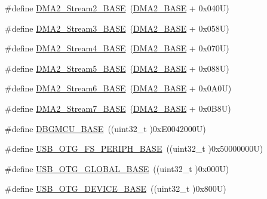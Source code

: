\begin{DoxyCompactItemize}
\item 
\#define \hyperlink{group___peripheral__registers__structures_gaed33a06f08188466f2ede06160984e9a}{D\+M\+A2\+\_\+\+Stream2\+\_\+\+B\+A\+SE}~(\hyperlink{group___peripheral__memory__map_gab72a9ae145053ee13d1d491fb5c1df64}{D\+M\+A2\+\_\+\+B\+A\+SE} + 0x040\+U)
\item 
\#define \hyperlink{group___peripheral__registers__structures_gaf3a9480e08c6ae94f4482e0cdaebdd17}{D\+M\+A2\+\_\+\+Stream3\+\_\+\+B\+A\+SE}~(\hyperlink{group___peripheral__memory__map_gab72a9ae145053ee13d1d491fb5c1df64}{D\+M\+A2\+\_\+\+B\+A\+SE} + 0x058\+U)
\item 
\#define \hyperlink{group___peripheral__registers__structures_gad1e67740e6301233473f64638145dd1f}{D\+M\+A2\+\_\+\+Stream4\+\_\+\+B\+A\+SE}~(\hyperlink{group___peripheral__memory__map_gab72a9ae145053ee13d1d491fb5c1df64}{D\+M\+A2\+\_\+\+B\+A\+SE} + 0x070\+U)
\item 
\#define \hyperlink{group___peripheral__registers__structures_gaed1460fdc407b6decfbffccb0260d0af}{D\+M\+A2\+\_\+\+Stream5\+\_\+\+B\+A\+SE}~(\hyperlink{group___peripheral__memory__map_gab72a9ae145053ee13d1d491fb5c1df64}{D\+M\+A2\+\_\+\+B\+A\+SE} + 0x088\+U)
\item 
\#define \hyperlink{group___peripheral__registers__structures_ga5e81174c96fd204fa7c82c815e85c8e6}{D\+M\+A2\+\_\+\+Stream6\+\_\+\+B\+A\+SE}~(\hyperlink{group___peripheral__memory__map_gab72a9ae145053ee13d1d491fb5c1df64}{D\+M\+A2\+\_\+\+B\+A\+SE} + 0x0\+A0\+U)
\item 
\#define \hyperlink{group___peripheral__registers__structures_gaa9faa708ad2440d24eb1064cba9bb06d}{D\+M\+A2\+\_\+\+Stream7\+\_\+\+B\+A\+SE}~(\hyperlink{group___peripheral__memory__map_gab72a9ae145053ee13d1d491fb5c1df64}{D\+M\+A2\+\_\+\+B\+A\+SE} + 0x0\+B8\+U)
\item 
\#define \hyperlink{group___peripheral__registers__structures_ga4adaf4fd82ccc3a538f1f27a70cdbbef}{D\+B\+G\+M\+C\+U\+\_\+\+B\+A\+SE}~((uint32\+\_\+t )0x\+E0042000\+U)
\item 
\#define \hyperlink{group___peripheral__registers__structures_gaa86d4c80849a74938924e73937b904e7}{U\+S\+B\+\_\+\+O\+T\+G\+\_\+\+F\+S\+\_\+\+P\+E\+R\+I\+P\+H\+\_\+\+B\+A\+SE}~((uint32\+\_\+t )0x50000000\+U)
\item 
\#define \hyperlink{group___peripheral__registers__structures_ga044aa4388e72d9d47a03f387fb8926fb}{U\+S\+B\+\_\+\+O\+T\+G\+\_\+\+G\+L\+O\+B\+A\+L\+\_\+\+B\+A\+SE}~((uint32\+\_\+t )0x000\+U)
\item 
\#define \hyperlink{group___peripheral__registers__structures_ga4d74a337597a77b1fca978202b519a18}{U\+S\+B\+\_\+\+O\+T\+G\+\_\+\+D\+E\+V\+I\+C\+E\+\_\+\+B\+A\+SE}~((uint32\+\_\+t )0x800\+U)

\end{DoxyCompactItemize}
